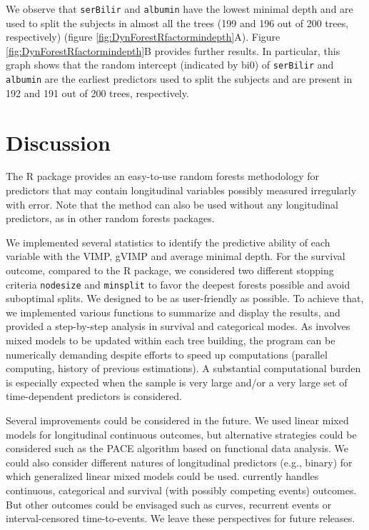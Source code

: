 We observe that \texttt{serBilir} and \texttt{albumin} have the lowest minimal depth and are used to split the subjects in almost all the trees (199 and 196 out of 200 trees, respectively) (figure \ref{fig:DynForestRfactormindepth}A). Figure \ref{fig:DynForestRfactormindepth}B provides further results. In particular, this graph shows that the random intercept (indicated by bi0) of \texttt{serBilir} and \texttt{albumin} are the earliest predictors used to split the subjects and are present in 192 and 191 out of 200 trees, respectively.

\section{Discussion}\label{discussion}

The  R package provides an easy-to-use random forests methodology for predictors that may contain longitudinal variables possibly measured irregularly with error. Note that the method can also be used without any longitudinal predictors, as in other random forests packages.

We implemented several statistics to identify the predictive ability of each variable with the VIMP, gVIMP and average minimal depth. For the survival outcome, compared to the  R package, we considered two different stopping criteria \texttt{nodesize} and \texttt{minsplit} to favor the deepest forests possible and avoid suboptimal splits. We designed  to be as user-friendly as possible. To achieve that, we implemented various functions to summarize and display the results, and provided a step-by-step analysis in survival and categorical modes. As  involves mixed models to be updated within each tree building, the program can be numerically demanding despite efforts to speed up computations (parallel computing, history of previous estimations). A substantial computational burden is especially expected when the sample is very large and/or a very large set of time-dependent predictors is considered.

Several improvements could be considered in the future. We used linear mixed models for longitudinal continuous outcomes, but alternative strategies could be considered such as the PACE algorithm \citep{yao_functional_2005} based on functional data analysis. We could also consider different natures of longitudinal predictors (e.g., binary) for which generalized linear mixed models could be used.  currently handles continuous, categorical and survival (with possibly competing events) outcomes. But other outcomes could be envisaged such as curves, recurrent events or interval-censored time-to-events. We leave these perspectives for future releases.

